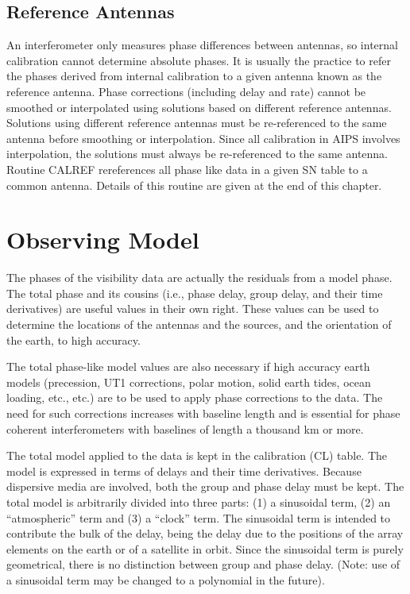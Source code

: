 \subsection{Reference Antennas }
An interferometer only measures phase differences between antennas, so
internal calibration cannot determine absolute phases.  It is usually
the practice to refer the phases derived from internal calibration to
a given antenna known as the reference antenna.  Phase corrections
(including delay and rate) cannot be smoothed or interpolated using
solutions based on different reference antennas. Solutions using
different reference antennas must be re-referenced to the same antenna
before smoothing or interpolation.  Since all calibration in AIPS
involves interpolation, the solutions must always be re-referenced to
the same antenna.  Routine CALREF rereferences all phase
like data in a given SN table to a common antenna.  Details of this
routine are given at the end of this chapter.

\section{Observing Model }
The phases of the visibility data are actually the residuals from a
model phase.  The total phase and its cousins (i.e., phase delay,
group delay, and their time derivatives) are useful values in their
own right.  These values can be used to determine the locations of the
antennas and the sources, and the orientation of the earth, to high
accuracy.

The total phase-like model values are also necessary if high accuracy
earth models (precession, UT1 corrections, polar motion, solid earth
tides, ocean loading, etc., etc.) are to be used to apply phase
corrections to the data. The need for such corrections increases with
baseline length and is essential for phase coherent interferometers
with baselines of length a thousand km or more.

The total model applied to the data is kept in the calibration (CL)
table.  The model is expressed in terms of delays and their time
derivatives.  Because dispersive media are involved, both the group
and phase delay must be kept. The total model is arbitrarily divided
into three parts: (1) a sinusoidal term, (2) an ``atmospheric'' term and
(3) a ``clock'' term. The sinusoidal term is intended to contribute the
bulk of the delay, being the delay due to the positions of the array
elements on the earth or of a satellite in orbit.  Since the
sinusoidal term is purely geometrical, there is no distinction between
group and phase delay.  (Note: use of a sinusoidal term may be changed
to a polynomial in the future).

